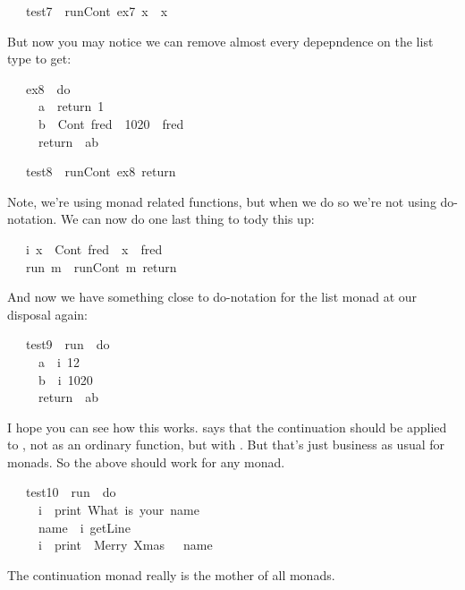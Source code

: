 \documentclass[12pt]{article}
\begin{document}
\begin{tabbing}\ttfamily
~~~test7~~runCont~ex7~x~~x
\end{tabbing}
But now you may notice we can remove almost every depepndence on the list type to get:
\begin{tabbing}\ttfamily
~~~ex8~~do\\
\ttfamily ~~~~~a~~return~1\\
\ttfamily ~~~~~b~~Cont~fred~~1020~~fred\\
\ttfamily ~~~~~return~~ab
\end{tabbing}
\begin{tabbing}\ttfamily
~~~test8~~runCont~ex8~return
\end{tabbing}
Note, we're using monad related functions, but when we do so we're not using do-notation. We can now do one last thing to tody this up:
\begin{tabbing}\ttfamily
~~~i~x~~Cont~fred~~x~~fred\\
\ttfamily ~~~run~m~~runCont~m~return
\end{tabbing}
And now we have something close to do-notation for the list monad at our disposal again:
\begin{tabbing}\ttfamily
~~~test9~~run~~do\\
\ttfamily ~~~~~a~~i~12\\
\ttfamily ~~~~~b~~i~1020\\
\ttfamily ~~~~~return~~ab
\end{tabbing}
I hope you can see how this works.  says that the continuation should be applied to , not as an ordinary function, but with . But that's just business as usual for monads. So the above should work for any monad.
\begin{tabbing}\ttfamily
~~~test10~~run~~do\\
\ttfamily ~~~~~i~~print~What~is~your~name\\
\ttfamily ~~~~~name~~i~getLine\\
\ttfamily ~~~~~i~~print~~Merry~Xmas~~~name
\end{tabbing}
The continuation monad really is the mother of all monads.
\end{document}
